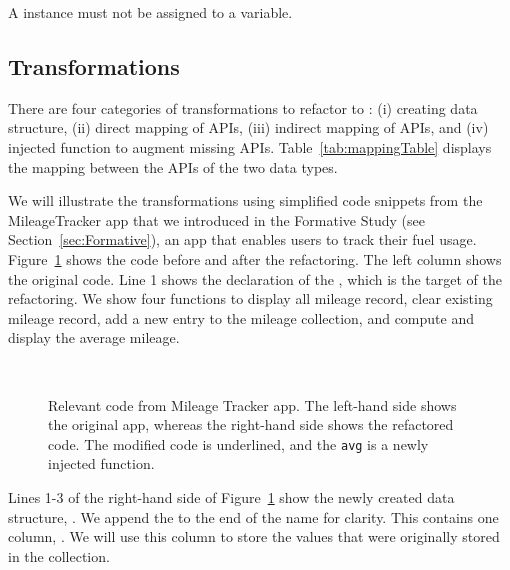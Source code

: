 \documentclass[article]{sigplanconf}
\begin{document}
\PTwo A \NC{} instance must not be assigned to a variable.

\subsection{Transformations}
\label{sec:transformations}

There are four categories of transformations to refactor \NC{} to : 
(i) creating \CDT{} data structure, (ii) direct mapping of APIs, (iii) indirect mapping of APIs, and (iv) injected function to augment missing APIs. Table~\ref{tab:mappingTable} displays the mapping between the APIs of the two data types.

We will illustrate the transformations using simplified code snippets from the MileageTracker app that we introduced in the Formative Study (see Section~\ref{sec:Formative}), an app that enables users to track their fuel usage. Figure~\ref{fig:codeTransformations} shows the code before and after the refactoring. The left column shows the original code. 
Line 1 shows the declaration of the  \NC{}, which is the target of the refactoring. We show four functions to display all mileage record, clear existing mileage record, add a new entry to the mileage collection, and compute and display the average mileage. \\

\begin{figure}
   \centering
    \mbox{
      \subfigure[before]{
      
      \label{fig:aicOverload}
      }
      \hspace{0.2in}
      \subfigure[after]{
      
      \label{fig:lambdaOverload}
      }
    }
    \caption{Relevant code from Mileage Tracker app. The left-hand side shows the original app, whereas the right-hand side shows the refactored code. The modified code is underlined, and the \texttt{avg} is a newly injected function.}
    \label{fig:codeTransformations}
\end{figure}


Lines 1-3 of the right-hand side of Figure~\ref{fig:codeTransformations} show the newly created data structure, . We append the  to the end of the name for clarity. This  contains one column, . We will use this column to store the values that were originally stored in the  collection.
\\
\end{document}
